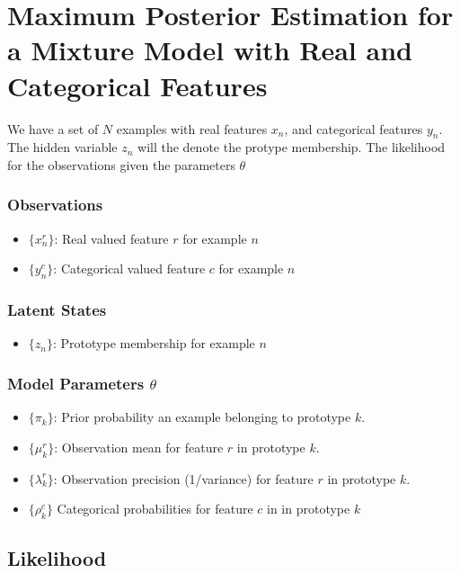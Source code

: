 \documentclass[a4paper,fleqn,10pt,openright,oldfontcommands]{memoir}
\begin{document}
\pagestyle{empty}

\section*{Maximum Posterior Estimation for a Mixture Model with Real and Categorical Features}

We have a set of $N$ examples with real features $x_n$, and categorical features $y_n$. The hidden variable $z_n$ will the denote the protype membership. The likelihood for the observations given the parameters $\theta$ 


\subsubsection*{Observations}
\begin{itemize}
    \item $\{ x_n^r \}$: Real valued feature $r$ for example $n$ 
    \item $\{ y_n^c \}$: Categorical valued feature $c$ for example $n$ 
\end{itemize}

\subsubsection*{Latent States}
\begin{itemize}
    \item $\{ z_n \}$: Prototype membership for example $n$  
\end{itemize}

\subsubsection*{Model Parameters $\theta$}
\begin{itemize}
    \item $\{ \pi_k \}$: Prior probability an example belonging to prototype $k$.
    \item $\{ \mu_k^r \}$: Observation mean for feature $r$ in prototype $k$.
    \item $\{ \lambda_k^r \}$: Observation precision (1/variance) 
          for feature $r$ in prototype $k$.
    \item $\{ \rho_k^c \}$ Categorical probabilities for feature 
          $c$ in in prototype $k$
\end{itemize}

\subsection*{Likelihood}
\end{document}
